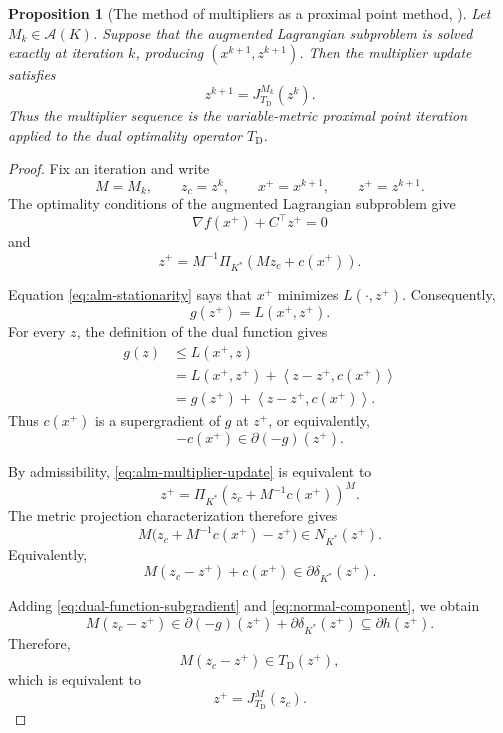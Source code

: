 \documentclass[a4paper,11pt]{book}
\theoremstyle{plain}
\newtheorem{proposition}[theorem]{Proposition}
\theoremstyle{definition}
\theoremstyle{remark}
\numberwithin{equation}{chapter}
\numberwithin{algorithm}{chapter}
\newcommand{\proj}[2]{\Pi_{#2}\!\left(#1\right)}
\newcommand{\inner}[2]{\left\langle #1, #2 \right\rangle}
\begin{document}
	\begin{proposition}[The method of multipliers as a proximal point method,
		\cite{Rockafellar1976b}]
		Let \(M_k\in\mathcal A(K)\). Suppose that the augmented Lagrangian
		subproblem is solved exactly at iteration \(k\), producing
		\((x^{k+1},z^{k+1})\). Then the multiplier update satisfies
		\begin{equation}
			z^{k+1}
			=
			J_{T_{\mathrm D}}^{M_k}(z^k).
		\end{equation}
		Thus the multiplier sequence is the variable-metric proximal point
		iteration applied to the dual optimality operator \(T_{\mathrm D}\).
	\end{proposition}
	
	\begin{proof}
		Fix an iteration and write
		\[
		M=M_k,
		\qquad
		z_c=z^k,
		\qquad
		x^+=x^{k+1},
		\qquad
		z^+=z^{k+1}.
		\]
		The optimality conditions of the augmented Lagrangian subproblem give
		\begin{equation}
			\nabla f(x^+)+C^\top z^+=0
			\label{eq:alm-stationarity}
		\end{equation}
		and
		\begin{equation}
			z^+
			=
			M^{-1}
			\proj{Mz_c+c(x^+)}{K^*}.
			\label{eq:alm-multiplier-update}
		\end{equation}
		
		Equation \eqref{eq:alm-stationarity} says that \(x^+\) minimizes
		\(L(\cdot,z^+)\). Consequently,
		\[
		g(z^+)=L(x^+,z^+).
		\]
		For every \(z\), the definition of the dual function gives
		\begin{align}
			g(z)
			&\leq
			L(x^+,z)\\
			&=
			L(x^+,z^+)
			+
			\inner{z-z^+}{c(x^+)}\\
			&=
			g(z^+)
			+
			\inner{z-z^+}{c(x^+)}.
		\end{align}
		Thus \(c(x^+)\) is a supergradient of \(g\) at \(z^+\), or equivalently,
		\begin{equation}
			-c(x^+)\in\partial(-g)(z^+).
			\label{eq:dual-function-subgradient}
		\end{equation}
		
		By admissibility,
		\eqref{eq:alm-multiplier-update} is equivalent to
		\[
		z^+
		=
		\proj{z_c+M^{-1}c(x^+)}{K^*}^{M}.
		\]
		The metric projection characterization therefore gives
		\[
		M\bigl(
		z_c+M^{-1}c(x^+)-z^+
		\bigr)
		\in
		N_{K^*}(z^+).
		\]
		Equivalently,
		\begin{equation}
			M(z_c-z^+)+c(x^+)
			\in
			\partial\delta_{K^*}(z^+).
			\label{eq:normal-component}
		\end{equation}
		
		Adding \eqref{eq:dual-function-subgradient} and
		\eqref{eq:normal-component}, we obtain
		\[
		M(z_c-z^+)
		\in
		\partial(-g)(z^+)
		+
		\partial\delta_{K^*}(z^+)
		\subseteq
		\partial h(z^+).
		\]
		Therefore,
		\[
		M(z_c-z^+)\in T_{\mathrm D}(z^+),
		\]
		which is equivalent to
		\[
		z^+
		=
		J_{T_{\mathrm D}}^M(z_c).
		\]
	\end{proof}
	
\end{document}
